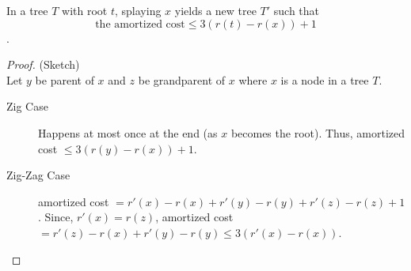 \documentclass[12pt]{article}
\begin{document}
\begin{lemma} In a tree $T$ with root $t$, splaying $x$ yields a new tree $T'$ such
    that $$\text{the amortized cost} \leq 3(r(t)-r(x))+1$$.
\end{lemma}
\begin{proof}(Sketch)\\
    Let $y$ be parent of $x$ and $z$ be grandparent of $x$ where $x$ is a node in a tree $T$.
    \begin{description}
        \item[Zig Case]             
            \begin{minipage}[t]{\linewidth}
              Happens at most once at the end (as $x$ becomes the root). Thus, amortized
              cost $\leq 3(r(y)-r(x))+1$.

              \raggedright
            \end{minipage}
        \item[Zig-Zag Case] 
            \begin{minipage}[t]{\linewidth}
              amortized cost $= r'(x) - r(x) + r'(y) - r(y) + r'(z) - r(z) + 1$.
              Since, $r'(x) = r(z)$, amortized cost $= r'(z) - r(x) + r'(y) - r(y) \leq 3(r'(x) -
              r(x))$.
              \raggedright
\end{minipage}
\end{description}
\end{proof}
\end{document}
